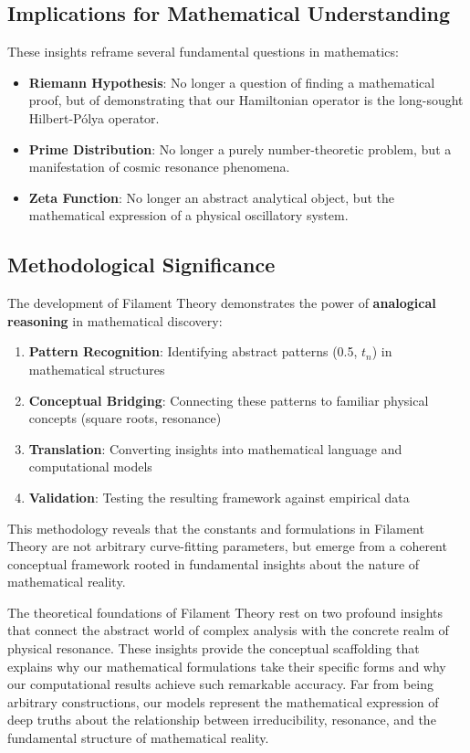 \subsection{Implications for Mathematical Understanding}

These insights reframe several fundamental questions in mathematics:

\begin{itemize}
\item \textbf{Riemann Hypothesis}: No longer a question of finding a mathematical proof, but of demonstrating that our Hamiltonian operator is the long-sought Hilbert-Pólya operator.

\item \textbf{Prime Distribution}: No longer a purely number-theoretic problem, but a manifestation of cosmic resonance phenomena.

\item \textbf{Zeta Function}: No longer an abstract analytical object, but the mathematical expression of a physical oscillatory system.
\end{itemize}

\subsection{Methodological Significance}

The development of Filament Theory demonstrates the power of \textbf{analogical reasoning} in mathematical discovery:

\begin{enumerate}
\item \textbf{Pattern Recognition}: Identifying abstract patterns (0.5, $t_n$) in mathematical structures
\item \textbf{Conceptual Bridging}: Connecting these patterns to familiar physical concepts (square roots, resonance)
\item \textbf{Translation}: Converting insights into mathematical language and computational models
\item \textbf{Validation}: Testing the resulting framework against empirical data
\end{enumerate}

This methodology reveals that the constants and formulations in Filament Theory are not arbitrary curve-fitting parameters, but emerge from a coherent conceptual framework rooted in fundamental insights about the nature of mathematical reality.

\begin{conclusion}
The theoretical foundations of Filament Theory rest on two profound insights that connect the abstract world of complex analysis with the concrete realm of physical resonance. These insights provide the conceptual scaffolding that explains why our mathematical formulations take their specific forms and why our computational results achieve such remarkable accuracy. Far from being arbitrary constructions, our models represent the mathematical expression of deep truths about the relationship between irreducibility, resonance, and the fundamental structure of mathematical reality.
\end{conclusion}

